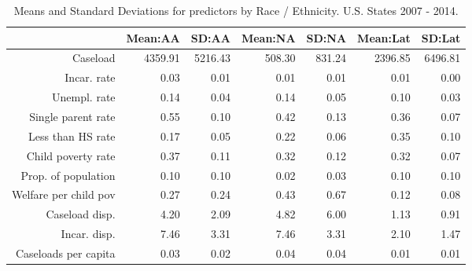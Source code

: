 \begin{table}[ht]
\centering
\caption{Means and Standard Deviations for predictors by Race / Ethnicity. U.S. States 2007 - 2014.} 
\label{descriptives}
\begin{tabular}{rrrrrrr}
  \hline
 & Mean:AA & SD:AA & Mean:NA & SD:NA & Mean:Lat & SD:Lat \\ 
  \hline
Caseload & 4359.91 & 5216.43 & 508.30 & 831.24 & 2396.85 & 6496.81 \\ 
  Incar. rate & 0.03 & 0.01 & 0.01 & 0.01 & 0.01 & 0.00 \\ 
  Unempl. rate & 0.14 & 0.04 & 0.14 & 0.05 & 0.10 & 0.03 \\ 
  Single parent rate & 0.55 & 0.10 & 0.42 & 0.13 & 0.36 & 0.07 \\ 
  Less than HS rate & 0.17 & 0.05 & 0.22 & 0.06 & 0.35 & 0.10 \\ 
  Child poverty rate & 0.37 & 0.11 & 0.32 & 0.12 & 0.32 & 0.07 \\ 
  Prop. of population & 0.10 & 0.10 & 0.02 & 0.03 & 0.10 & 0.10 \\ 
  Welfare per child pov & 0.27 & 0.24 & 0.43 & 0.67 & 0.12 & 0.08 \\ 
  Caseload disp. & 4.20 & 2.09 & 4.82 & 6.00 & 1.13 & 0.91 \\ 
  Incar. disp. & 7.46 & 3.31 & 7.46 & 3.31 & 2.10 & 1.47 \\ 
  Caseloads per capita & 0.03 & 0.02 & 0.04 & 0.04 & 0.01 & 0.01 \\ 
   \hline
\end{tabular}
\end{table}
